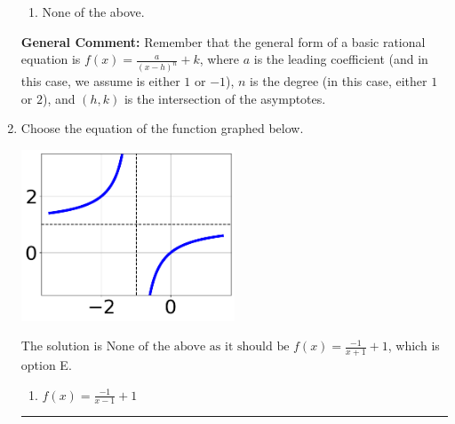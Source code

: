 \documentclass{extbook}[14pt]
\newcommand{\litem}[1]{\item #1

\rule{\textwidth}{0.4pt}}
\begin{document}
\begin{enumerate}
{\begin{enumerate}[label=\Alph*.]
\item None of the above.\end{enumerate}
\textbf{General Comment:} Remember that the general form of a basic rational equation is $ f(x) = \frac{a}{(x-h)^n} + k$, where $a$ is the leading coefficient (and in this case, we assume is either $1$ or $-1$), $n$ is the degree (in this case, either $1$ or $2$), and $(h, k)$ is the intersection of the asymptotes.
}
\litem{
Choose the equation of the function graphed below.

\begin{center}
    \includegraphics[width=0.5\textwidth]{../Figures/rationalGraphToEquationCopyC.png}
\end{center}


The solution is \( \text{None of the above as it should be } f(x) = \frac{-1}{x + 1} + 1 \), which is option E.\begin{enumerate}[label=\Alph*.]
\item \( f(x) = \frac{-1}{x - 1} + 1 \)


\end{enumerate}}
\end{enumerate}
\end{document}
